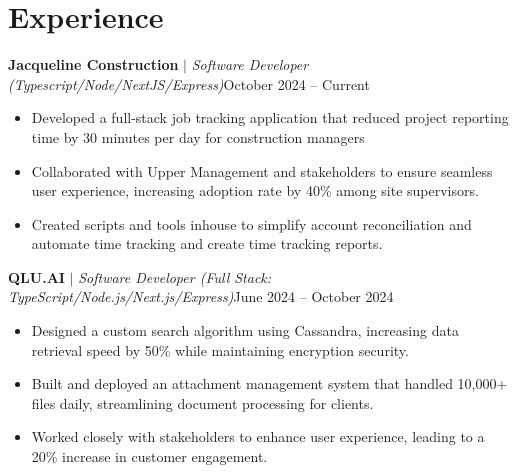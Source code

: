
\section{Experience}
  \resumeSubHeadingListStart

          \resumeProjectHeading
          {\textbf{Jacqueline Construction}\vspace{8pt} $|$ \footnotesize\emph{Software Developer (Typescript/Node/NextJS/Express)}}{October 2024 -- Current}
            \begin{itemize}
              \item 
              Developed a full-stack job tracking application that reduced project reporting time by 30 minutes per day for construction managers
              \item 
              Collaborated with Upper Management and stakeholders to ensure seamless user experience, increasing adoption rate by 40\% among site supervisors.
              \item 
              Created scripts and tools inhouse to simplify account reconciliation and automate time tracking and create time tracking reports. 
            \end{itemize}
          
          \resumeProjectHeading 
          {\textbf{QLU.AI}\vspace{8pt} $|$ \footnotesize\emph{Software Developer (Full Stack: TypeScript/Node.js/Next.js/Express)}}{June 2024 -- October 2024}
          \begin{itemize}
            \item Designed a custom search algorithm using Cassandra, increasing data retrieval speed by 50\% while maintaining encryption security.
            \item Built and deployed an attachment management system that handled 10,000+ files daily, streamlining document processing for clients.
            \item Worked closely with stakeholders to enhance user experience, leading to a 20\% increase in customer engagement.
          \end{itemize}
          

